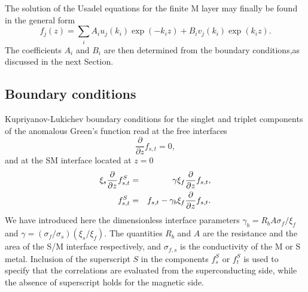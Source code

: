 \documentclass[prb,amsmath,amssymb,reprint]{revtex4-2}
\begin{document}
The solution of the Usadel equations for the finite M layer may finally be found in the general form
\begin{equation}  \label{GenSol}
f_{j}(z) =\sum\limits_{i}A_{i}u_{j}(k_{i})\exp
(-k_{i}z)+B_{i}v_{j}(k_{i})\exp (k_{i}z).
\end{equation}
The coefficients $A_{i}$ and $B_{i}$ are then determined from the boundary conditions,as discussed in the next Section.

\subsection{Boundary conditions}

Kupriyanov-Lukichev \cite{KL} boundary conditions for the singlet and triplet components of the anomalous Green's function read at the free interfaces
\begin{equation}
\frac{\partial }{\partial z}f_{s,t}=0,  \label{KLBCfree}
\end{equation}%
and at the SM interface located at $z=0$
\begin{eqnarray}
\xi_s \frac{\partial }{\partial z}f_{s,t}^{S} &=&\gamma \xi_f \frac{\partial }{\partial z%
}f_{s,t},  \label{KLBC} \\
f_{s,t}^{S} &=&f_{s,t}-\gamma _{b} \xi_f \frac{\partial }{\partial z}f_{s,t}.
\notag
\end{eqnarray}
We have introduced here  the dimensionless interface parameters $\gamma _{b}=R_{b}A\sigma
_{f}/\xi_f$ and $\gamma =(\sigma _{f}/\sigma _{s})(\xi _{s}/\xi_f)$. The quantities $R_{b}$
and $A$ are the resistance and the area of the S/M interface  respectively,
and $\sigma _{f,s}$ is the conductivity of the M or S metal. Inclusion of the  superscript $S$ in the components $f_s^S$ or $f_t^S$ is used to specify that the correlations are evaluated from the superconducting side, while the absence of superscript holds for the magnetic side.
\end{document}
